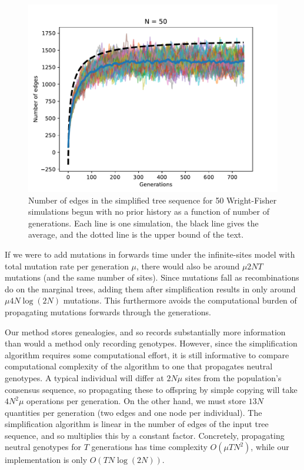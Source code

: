 \documentclass{article}
\begin{document}
\begin{figure}
    \begin{center}
        \includegraphics{sims/num_edges_50}
    \end{center}
    \caption{
        Number of edges in the simplified tree sequence
        for 50 Wright-Fisher simulations begun with no prior history
        as a function of number of generations.
        Each line is one simulation, the black line gives the average,
        and the dotted line is the upper bound of the text.
        \label{fig:num_edges}
    }
\end{figure}


If we were to add mutations in forwards time
under the infinite-sites model with total mutation rate per generation $\mu$,
there would also be around $\mu 2NT$ mutations (and the same number of sites).
Since mutations fall as recombinations do on the marginal trees,
adding them after simplification results in only around $\mu 4 N \log(2N)$ mutations.
This furthermore avoids the computational burden of propagating mutations forwards through the generations.

Our method stores genealogies, and so records substantially more information
than would a method only recording genotypes.
However, since the simplification algorithm requires some computational effort,
it is still informative to compare computational complexity of the algorithm
to one that propagates neutral genotypes.
A typical individual will differ at $2 N \mu$ sites from the population's consensus sequence,
so propagating these to offspring by simple copying will take $4 N^2 \mu$ operations per generation.
On the other hand, we must store $13N$ quantities per generation (two edges and one node per individual).
The simplification algorithm is linear in the number of edges of the input tree sequence,
and so multiplies this by a constant factor.
Concretely, propagating neutral genotypes for $T$ generations has time complexity $O(\mu T N^2)$,
while our implementation is only $O(T N \log(2N))$.
\end{document}
